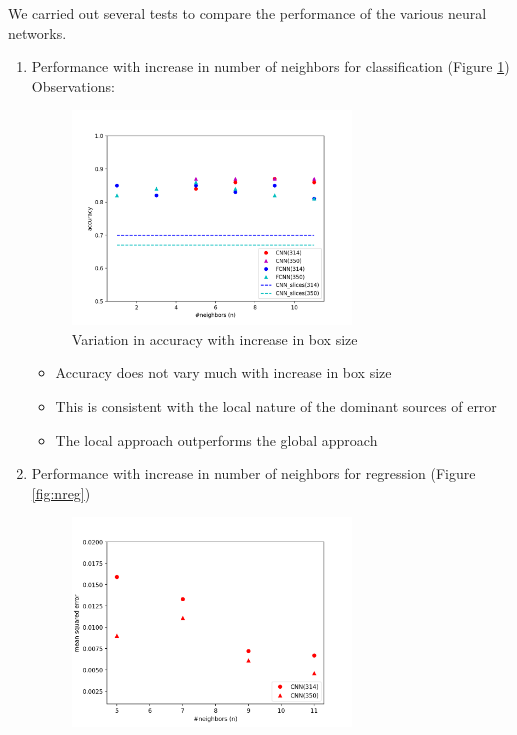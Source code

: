 \documentclass{article}
\begin{document}
We carried out several tests to compare the performance of the various neural networks. 
\begin{enumerate}
    \item Performance with increase in number of neighbors for classification (Figure \ref{fig:nclass}) \\
    Observations:
    \begin{figure}
        \centering
        \includegraphics[width=0.7\textwidth]{figures/nclass.png}
        \caption{Variation in accuracy with increase in box size}
        \label{fig:nclass}
    \end{figure}
    \begin{itemize}
        \item Accuracy does not vary much with increase in box size
        \item This is consistent with the local nature of the dominant sources of error
        \item The local approach outperforms the global approach
    \end{itemize}
    \item Performance with increase in number of neighbors for regression (Figure \ref{fig:nreg}) \\
    \begin{figure}
        \centering
        \includegraphics[width=0.7\textwidth]{figures/nreg.png}

\end{figure}
\end{enumerate}
\end{document}
